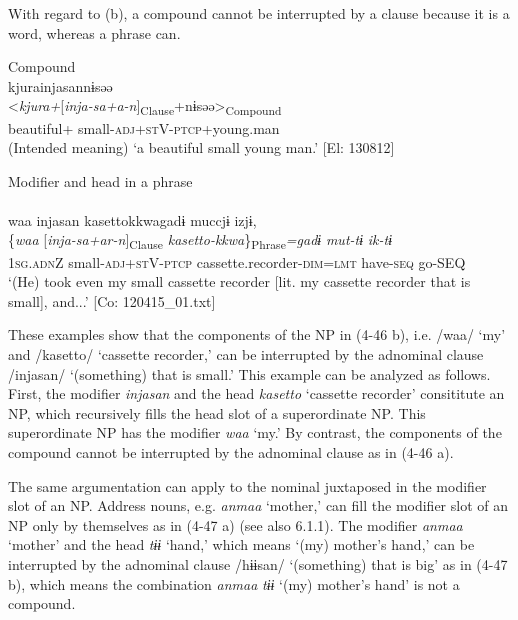 With regard to (b), a compound cannot be interrupted by a clause because it is a word, whereas a phrase can.

\ea \label{ex:4.46} \ea  Compound \label{ex:4.46a}\\
\glll      *kjurainjasannɨsəə\\
      <\textit{kjura+}[\textit{inja-sa+a-n}]\textsubscript{Clause}+nɨsəə>\textsubscript{Compound}\\
      beautiful+ small-\textsc{adj}+\textsc{st}V-\textsc{ptcp}+young.man\\
    \glt       (Intended meaning) ‘a beautiful small young man.’ [El: 130812]

  \ex Modifier and head in a phrase\\\\
\glll     waa  injasan  {\textbar}kasetto{\textbar}kkwagadɨ  muccjɨ  izjɨ,  \\
      \{\textit{waa}  [\textit{inja-sa+ar-n}]\textsubscript{Clause} \textit{kasetto-kkwa}\}\textsubscript{Phrase}\textit{=gadɨ}   \textit{mut-tɨ}  \textit{ik-tɨ}  \\
      1\textsc{sg}.\textsc{adn}Z  small-\textsc{adj}+\textsc{st}V-\textsc{ptcp}  cassette.recorder-\textsc{dim}=\textsc{lmt}  have-\textsc{seq}  go-SEQ        \\
    \glt       ‘(He) took even my small cassette recorder [lit. my cassette recorder that is small], and...’ [Co: 120415\_01.txt]
    \z
\z

These examples show that the components of the NP in (4-46 b), i.e. /waa/ ‘my’ and /kasetto/ ‘cassette recorder,’ can be interrupted by the adnominal clause /injasan/ ‘(something) that is small.’ This example can be analyzed as follows. First, the modifier \textit{injasan} and the head \textit{kasetto} ‘cassette recorder’ consititute an NP, which recursively fills the head slot of a superordinate NP. This superordinate NP has the modifier \textit{waa} ‘my.’ By contrast, the components of the compound cannot be interrupted by the adnominal clause as in (4-46 a).

The same argumentation can apply to the nominal juxtaposed in the modifier slot of an NP. Address nouns, e.g. \textit{anmaa} ‘mother,’ can fill the modifier slot of an NP only by themselves as in (4-47 a) (see also 6.1.1). The modifier \textit{anmaa} ‘mother’ and the head \textit{tɨɨ} ‘hand,’ which means ‘(my) mother’s hand,’ can be interrupted by the adnominal clause /hɨɨsan/ ‘(something) that is big’ as in (4-47 b), which means the combination \textit{anmaa} \textit{tɨɨ} ‘(my) mother’s hand’ is not a compound.

